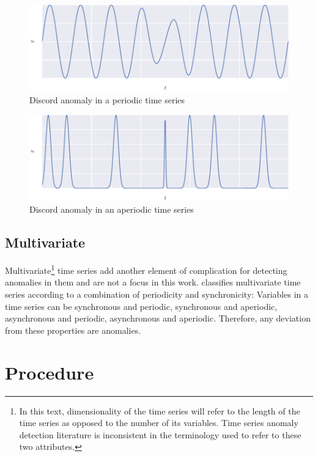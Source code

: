 \begin{figure}[H]
  \centering
  \includegraphics{figs/discord_per.pdf}
  \caption{Discord anomaly in a periodic time series}
  \label{fig:perdiscordanom}
\end{figure}

\begin{figure}[H]
  \centering
  \includegraphics{figs/discord_aper.pdf}
  \caption{Discord anomaly in an aperiodic time series}
  \label{fig:aperdiscordanom}
\end{figure}

\subsection{Multivariate}

Multivariate\footnote{In this text, dimensionality of the time series will refer to the length of the time series as opposed to the number of its variables. Time series anomaly detection literature is inconsistent in the terminology used to refer to these two attributes.} time series add another element of complication for detecting anomalies in them and are not a focus in this work. \cite{Cheboli2010} classifies multivariate time series according to a combination of periodicity and synchronicity: Variables in a time series can be synchronous and periodic, synchronous and aperiodic, asynchronous and periodic, asynchronous and aperiodic. Therefore, any deviation from these properties are anomalies.




\section{Procedure}


